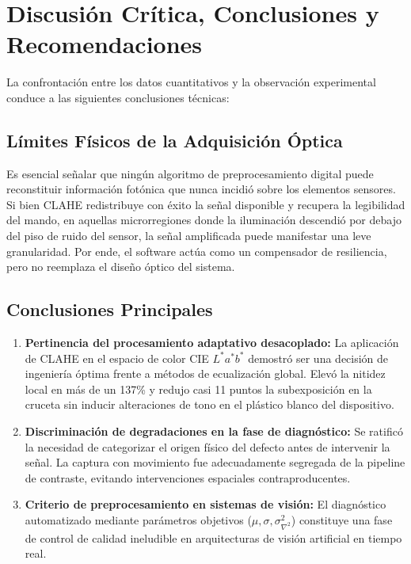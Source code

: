 \documentclass[12pt,letterpaper]{article}
\begin{document}
\section{Discusi\'on Cr\'itica, Conclusiones y Recomendaciones}
La confrontaci\'on entre los datos cuantitativos y la observaci\'on experimental conduce a las siguientes conclusiones t\'ecnicas:

\subsection{L\'imites F\'isicos de la Adquisici\'on \'Optica}
Es esencial se\~nalar que ning\'un algoritmo de preprocesamiento digital puede reconstituir informaci\'on fot\'onica que nunca incidi\'o sobre los elementos sensores. Si bien CLAHE redistribuye con \'exito la se\~nal disponible y recupera la legibilidad del mando, en aquellas microrregiones donde la iluminaci\'on descendi\'o por debajo del piso de ruido del sensor, la se\~nal amplificada puede manifestar una leve granularidad. Por ende, el software act\'ua como un compensador de resiliencia, pero no reemplaza el dise\~no \'optico del sistema.

\subsection{Conclusiones Principales}
\begin{enumerate}
    \item \textbf{Pertinencia del procesamiento adaptativo desacoplado:} La aplicaci\'on de CLAHE en el espacio de color CIE $L^*a^*b^*$ demostr\'o ser una decisi\'on de ingenier\'ia \'optima frente a m\'etodos de ecualizaci\'on global. Elev\'o la nitidez local en m\'as de un 137\% y redujo casi 11 puntos la subexposici\'on en la cruceta sin inducir alteraciones de tono en el pl\'astico blanco del dispositivo.
    \item \textbf{Discriminaci\'on de degradaciones en la fase de diagn\'ostico:} Se ratific\'o la necesidad de categorizar el origen f\'isico del defecto antes de intervenir la se\~nal. La captura con movimiento fue adecuadamente segregada de la pipeline de contraste, evitando intervenciones espaciales contraproducentes.
    \item \textbf{Criterio de preprocesamiento en sistemas de visi\'on:} El diagn\'ostico automatizado mediante par\'ametros objetivos ($\mu, \sigma, \sigma^2_{\nabla^2}$) constituye una fase de control de calidad ineludible en arquitecturas de visi\'on artificial en tiempo real.
\end{enumerate}
\end{document}
